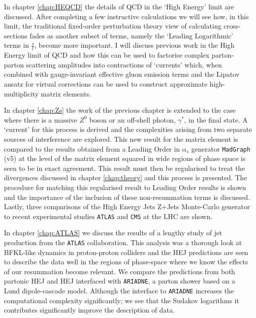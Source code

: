 	In chapter \ref{chap:HEQCD} the details of QCD in the `High Energy' limit are discussed.  After completing a
	few instructive calculations we will see how, in this limit, the traditional fixed-order perturbation theory
	view of calculating cross-sections fades as another subset of terms, namely the `Leading Logarithmic' terms in
	$\frac{s}{t}$, become more important.  I will discuss previous work in the High Energy limit of QCD and how
	this can be used to factorise complex parton-parton scattering amplitudes into contractions of `currents' which,
	when combined with gauge-invariant effective gluon emission terms and the Lipatov ansatz for virtual corrections
	can be used to construct approximate high-multiplicity matrix elements.

	In chapter \ref{chap:Zs} the work of the previous chapter is extended to the case where there is a massive
	$Z^0$ boson or an off-shell photon, $\gamma^*$, in the final state.  A `current' for this process is derived
	and the complexities arising from two separate sources of interference are explored.  This new result for the
	matrix element is compared to the results obtained from a Leading Order in $\alpha_s$
	generator \texttt{MadGraph} (v5) at the level of the matrix element squared in wide regions of phase space is seen
	to be in exact agreement. This result must then be regularised to treat the divergences discussed in chapter
	\ref{chap:theory} and this process is presented.  The procedure for matching this regularised result to Leading
	Order results is shown and the importance of the inclusion of these non-resummation terms is discussed. Lastly,
	three comparisons of the High Energy Jets Z+Jets Monte-Carlo generator to recent experimental studies
	\texttt{ATLAS} and \texttt{CMS} at the LHC are shown.

	In chapter \ref{chap:ATLAS} we discuss the results of a lengthy study of jet production from the \texttt{ATLAS}
	collaboration.  This analysis was a thorough look at BFKL-like dynamics in proton-proton colliders and the HEJ
	predictions are seen to describe the data well in the regions of phase-space where we know the effects of our
	resummation become relevant.  We compare the predictions from both partonic HEJ and HEJ interfaced with
	\texttt{ARIADNE}, a parton shower based on a Lund dipole-cascade model.  Although the interface to \texttt{ARIADNE}
	increases the computational complexity significantly; we see that the Sudakov logarithms it contributes significantly
	improve the description of data.

